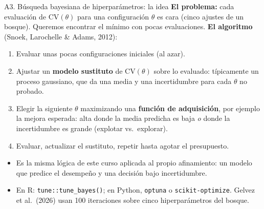 \documentclass{beamer}
\newcommand{\1}{\mathbb{I}}
\begin{document}
\begin{frame}{A3. Búsqueda bayesiana de hiperparámetros: la idea}
\small
\textbf{El problema:} cada evaluación de $\mathrm{CV}(\theta)$ para una configuración $\theta$ es cara (cinco ajustes de un bosque). Queremos encontrar el mínimo con pocas evaluaciones.
\pause
\vspace{0.1cm}
\textbf{El algoritmo} (Snoek, Larochelle \& Adams, 2012):
\begin{enumerate}\itemsep3pt
  \item Evaluar unas pocas configuraciones iniciales (al azar).
  \item Ajustar un \textbf{modelo sustituto} de $\mathrm{CV}(\theta)$ sobre lo evaluado: típicamente un proceso gaussiano, que da una media y una incertidumbre para cada $\theta$ no probado.
  \item Elegir la siguiente $\theta$ maximizando una \textbf{función de adquisición}, por ejemplo la mejora esperada: alta donde la media predicha es baja \emph{o} donde la incertidumbre es grande (explotar vs.\ explorar).
  \item Evaluar, actualizar el sustituto, repetir hasta agotar el presupuesto.
\end{enumerate}
\pause
\begin{itemize}\itemsep3pt
  \item Es la misma lógica de este curso aplicada al propio afinamiento: un modelo que predice el desempeño y una decisión bajo incertidumbre.
  \item En R: \texttt{tune::tune\_bayes()}; en Python, \texttt{optuna} o \texttt{scikit-optimize}. Gelvez et al.\ (2026) usan 100 iteraciones sobre cinco hiperparámetros del bosque.
\end{itemize}
\end{frame}

\end{document}
